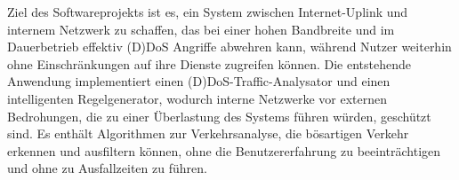 \documentclass[../review_1.tex]{subfiles}
\begin{document}
Ziel des Softwareprojekts ist es, ein System zwischen Internet-Uplink und internem Netzwerk zu schaffen, das bei einer hohen Bandbreite und im Dauerbetrieb effektiv (D)DoS Angriffe abwehren kann, während Nutzer weiterhin ohne Einschränkungen auf ihre Dienste zugreifen können. Die entstehende Anwendung implementiert einen (D)DoS-Traffic-Analysator und einen intelligenten Regelgenerator, wodurch interne Netzwerke vor externen Bedrohungen, die zu einer Überlastung des Systems führen würden, geschützt sind. Es enthält Algorithmen zur Verkehrsanalyse, die bösartigen Verkehr erkennen und ausfiltern können, ohne die Benutzererfahrung zu beeinträchtigen und ohne zu Ausfallzeiten zu führen.
\end{document}
